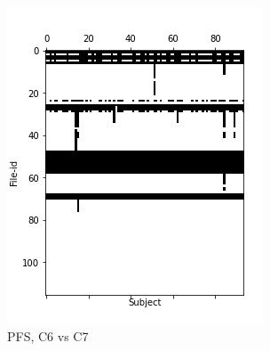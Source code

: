 \documentclass[10pt, conference, compsocconf]{IEEEtran}
\begin{document}
\begin{figure}[h!]
\begin{subfigure}[b]{0.45\columnwidth}
        \includegraphics[width=\columnwidth]{data/Utility_Matrix/PreFreeSurfer/PFS_6v7_utility_matrix.png}
  \caption{PFS, C6 vs C7}
  \end{subfigure}
  \begin{subfigure}[b]{0.45\columnwidth}

\end{subfigure}
\end{figure}
\end{document}
